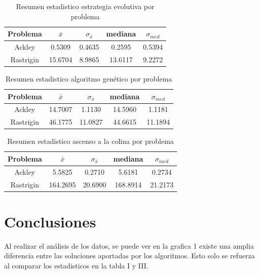 \documentclass[twocolumn]{IEEEtran}
\begin{document}
\begin{table}[htpb!]
\centering
\begin{tabular}{|c|c|c|c|c|}
    \hline
    Problema & $\bar{x}$ & $\sigma_{\bar{x}}$ & mediana & $\sigma_{med}$ \\
    \hline
    Ackley & 0.5309 & 0.4635 & 0.2595 & 0.5394 \\
    \hline
    Rastrigin & 15.6704 & 8.9865 & 13.6117 & 9.2272 \\
    \hline
\end{tabular}
\caption{Resumen estadistico estrategia evolutiva por problema}
\label{table:result_es}
\end{table}

\begin{table}[htpb!]
    \centering
    \begin{tabular}{|c|c|c|c|c|}
        \hline
        Problema & $\bar{x}$ & $\sigma_{\bar{x}}$ & mediana & $\sigma_{med}$ \\
        \hline
        Ackley & 14.7007 & 1.1130 & 14.5960 & 1.1181 \\
        \hline
        Rastrigin & 46.1775 & 11.0827 & 44.6615 & 11.1894 \\
        \hline
    \end{tabular}
    \caption{Resumen estadistico algoritmo genético por problema}
    \label{table:results_ga}
\end{table}

\begin{table}[htpb!]
    \centering
    \begin{tabular}{|c|c|c|c|c|}
        \hline
        Problema & $\bar{x}$ & $\sigma_{\bar{x}}$ & mediana & $\sigma_{med}$ \\
        \hline
        Ackley & 5.5825 & 0.2710 & 5.6181  & 0.2734 \\
        \hline
        Rastrigin & 164.2695 & 20.6900 & 168.8914 & 21.2173 \\
        \hline
    \end{tabular}
    \caption{Resumen estadistico ascenso a la colina por problema}
    \label{table:results_hc}
\end{table}

\section{Conclusiones}

Al realizar el análisis de los datos, se puede ver en la grafica 1
existe una amplia diferencia entre las soluciones aportadas por los algoritmos.
Esto solo se refuerza al comparar los estadisticos en la tabla I y
III. \\
\end{document}
